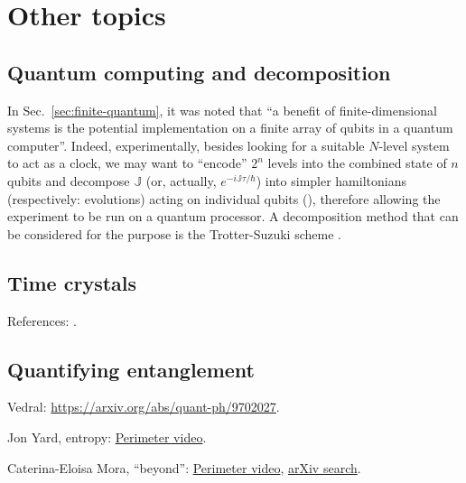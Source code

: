 \section{Other topics}\label{sec:outlook-misc}

\subsection{Quantum computing and decomposition}

In Sec.~\ref{sec:finite-quantum}, it was noted that
``a benefit of finite-dimensional systems is the potential implementation on a finite array of
qubits in a quantum computer''.
Indeed,
experimentally,
besides looking for a suitable $N$-level system to act as a clock,
we may want to ``encode'' $2^{n}$ levels into the combined state of $n$
qubits and
decompose $\mathbb{J}$ (or, actually, $e^{-i\mathbb{J}\tau/\hbar}$)
into simpler hamiltonians (respectively: evolutions)
acting on individual qubits (),
therefore allowing the experiment to be run on a quantum processor.
A decomposition method that can be considered for the purpose
is the Trotter-Suzuki scheme
\parencite{Trotter-Suzuki:exp, Trotter-Suzuki:GPU}.

\subsection{Time crystals}

References: \cite{crystal3,crystal2012}.


\subsection{Quantifying entanglement}

Vedral: \url{https://arxiv.org/abs/quant-ph/9702027}.

Jon Yard, entropy: \href{http://www.perimeterinstitute.ca/fr/videos/quantifying-entanglement-quantum-entropy}{Perimeter video}.

Caterina-Eloisa Mora, ``beyond'':
\href{https://www.perimeterinstitute.ca/videos/quantifying-quantumness-correlations-beyond-entanglement-and-back}{Perimeter video},
\href{https://arxiv.org/search/advanced?advanced=&terms-0-operator=AND&terms-0-term=Mora%2C+caterina-eloisa&terms-0-field=author&terms-1-operator=OR&terms-1-term=mora%2C+c+e&terms-1-field=author&classification-physics_archives=all&classification-include_cross_list=include&date-filter_by=all_dates&date-year=&date-from_date=&date-to_date=&date-date_type=submitted_date&abstracts=show&size=50&order=-announced_date_first}{arXiv search}.

